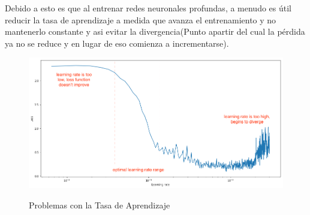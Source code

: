 		Debido a esto es que al entrenar redes neuronales profundas, a menudo es útil reducir la tasa de aprendizaje a medida que avanza el entrenamiento y no mantenerlo constante y asi evitar la divergencia(Punto apartir del cual la pérdida ya no se reduce y en lugar de eso comienza a incrementarse).


		\begin{figure}[H]
		\includegraphics[width=1\textwidth]{images/desarrollo/entrenamiento/lr_finder}
		\begin{center}
		\caption{\small{Problemas con la Tasa de Aprendizaje}}
		{\small{\citep {AdamImg}}}
		\end{center}
		\vspace{-1.5em}
		\end{figure}

